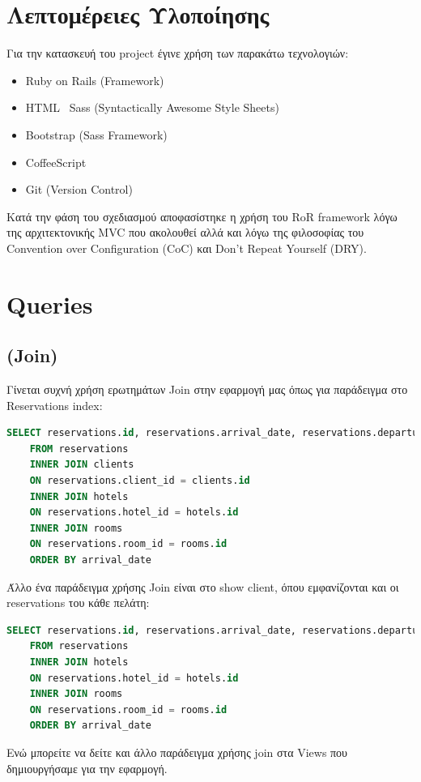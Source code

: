 \documentclass[a4paper,12pt]{article}
\begin{document}
\section{Λεπτομέρειες Υλοποίησης}
Για την κατασκευή του project έγινε χρήση των παρακάτω τεχνολογιών:
\begin{itemize}
  \item Ruby on Rails (Framework)
  \item HTML \ Sass (Syntactically Awesome Style Sheets) 
  \item Bootstrap (Sass Framework)
  \item CoffeeScript
  \item Git (Version Control)
\end{itemize}

Κατά την φάση του σχεδιασμού αποφασίστηκε η χρήση του RoR framework λόγω της αρχιτεκτονικής MVC που ακολουθεί αλλά και λόγω της φιλοσοφίας του Convention over Configuration (CoC) και Don't Repeat Yourself (DRY).

\section{Queries}
	\subsection{(Join)}
	Γίνεται συχνή χρήση ερωτημάτων Join στην εφαρμογή μας όπως για παράδειγμα στο Reservations index:
	\begin{lstlisting}[language=SQL]
	SELECT reservations.id, reservations.arrival_date, reservations.departure_date, reservations.created_at, reservations.updated_at, clients.first_name, clients.last_name, hotels.name, rooms.room_type
	FROM reservations
	INNER JOIN clients
	ON reservations.client_id = clients.id
	INNER JOIN hotels
	ON reservations.hotel_id = hotels.id
	INNER JOIN rooms
	ON reservations.room_id = rooms.id
	ORDER BY arrival_date
	\end{lstlisting}
	Άλλο ένα παράδειγμα χρήσης Join είναι στο show client, όπου εμφανίζονται και οι reservations του κάθε πελάτη:
	\begin{lstlisting}[language=SQL]
	SELECT reservations.id, reservations.arrival_date, reservations.departure_date, reservations.created_at, reservations.updated_at, hotels.name, rooms.room_type
	FROM reservations
	INNER JOIN hotels
	ON reservations.hotel_id = hotels.id
	INNER JOIN rooms
	ON reservations.room_id = rooms.id
	ORDER BY arrival_date
	\end{lstlisting}
	Ενώ μπορείτε να δείτε και άλλο παράδειγμα χρήσης join στα Views που δημιουργήσαμε για την εφαρμογή.
	
\end{document}
